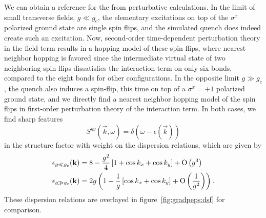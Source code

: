 We can obtain a reference for the  from perturbative calculations.
%
In the limit of small transverse fields, $g \ll g_c$, the elementary excitations on top of the $\sigma^x$ polarized ground state are single spin flips, and the simulated quench does indeed create such an excitation.
%
Now, second-order time-dependent perturbation theory in the field term results in a hopping model of these spin flips, where nearest neighbor hopping is favored since the intermediate virtual state of two neighboring spin flips dissatisfies the interaction term on only six bonds, compared to the eight bonds for other configurations.
%
In the opposite limit $g \gg g_c$, the quench also induces a spin-flip, this time on top of a $\sigma^x = +1$ polarized ground state, and we directly find a nearest neighbor hopping model of the spin flips in first-order perturbation theory of the interaction term.
%
In both cases, we find sharp features
\begin{equation}
    \label{eq:gradpeps:approx_contraction:results:expected_dsf}
    S^{yy}(\vec{k},\omega) = \delta( \omega - \epsilon(\vec{k}) )
\end{equation}
in the structure factor with weight on the dispersion relations, which are given by
\begin{align}
    \label{eq:gradpeps:approx_contraction:results:perturbative_dispersion_low_g}
    \epsilon_{g \ll g_c}(\mathbf{k}) 
    &= 8 - \frac{g^2}{4}\left[1 + \cos k_x + \cos k_y\right]+ \mathrm{O}\left(g^3\right)
    \\
    \label{eq:gradpeps:approx_contraction:results:perturbative_dispersion_high_g}
    \epsilon_{g \gg g_c}(\mathbf{k}) 
    &= 2g \left(1 - \frac{1}{g}\left[\cos k_x + \cos k_y\right] + \mathrm{O}\left(\frac{1}{g^2}\right)\right)
    .
\end{align}
These dispersion relations are overlayed in figure~\ref{fig:gradpeps:dsf} for comparison.
